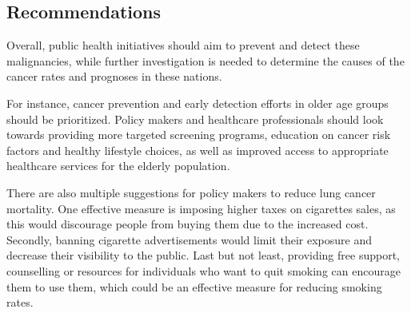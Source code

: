 \documentclass[11pt,a4paper,]{article}
\begin{document}
\hypertarget{recommendations}{%
\subsection{Recommendations}\label{recommendations}}

Overall, public health initiatives should aim to prevent and detect these malignancies, while further investigation is needed to determine the causes of the cancer rates and prognoses in these nations.

For instance, cancer prevention and early detection efforts in older age groups should be prioritized. Policy makers and healthcare professionals should look towards providing more targeted screening programs, education on cancer risk factors and healthy lifestyle choices, as well as improved access to appropriate healthcare services for the elderly population.

There are also multiple suggestions for policy makers to reduce lung cancer mortality. One effective measure is imposing higher taxes on cigarettes sales, as this would discourage people from buying them due to the increased cost. Secondly, banning cigarette advertisements would limit their exposure and decrease their visibility to the public. Last but not least, providing free support, counselling or resources for individuals who want to quit smoking can encourage them to use them, which could be an effective measure for reducing smoking rates.

\printbibliography
\end{document}
